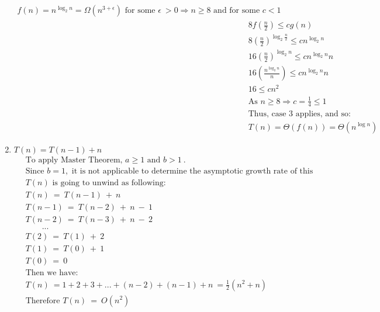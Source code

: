 \documentclass[a4paper]{scrartcl}
\begin{document}
\begin{enumerate}[label=(\alph*)]
\begin{align*}
   f(n)=n^{\log_2{n}}=\Omega(n^{3+\epsilon})\text{ for some }\epsilon\ >0 \Rightarrow n \geq 8\text{ and for some }c < 1\\ &\
   8f(\frac{n}{2}) \leq c g(n)\\ &\
   8(\frac{n}{2})^{\log_2{\frac{n}{2}}} \leq c n^{\log_2{n}} \\ &\
   16(\frac{n}{2})^{\log_2{n}} \leq c n^{\log_2{n}}n\\ &\
   16(\frac{n^{\log_2{n}}}{n}) \leq c n^{\log_2{n}}n\\ &\ 
   16 \leq c n^2 \\ &\ 
   \text{As } n\geq 8 \Rightarrow c = \frac{1}{4} \leq 1\\ &\
   \text{Thus, case 3 applies, and so: }\\ &\ T(n)=\Theta(f(n))=\Theta(n^{\log{n}})
\end{align*}
\item $T (n) = T (n - 1) + n$
\begin{align*}
  &\ \text{To apply Master Theorem, }a \geq 1\text{ and }b > 1\ .\\ &\
  \text{Since }b = 1,\text{ it is not applicable to determine the asymptotic growth rate of this recurrences.}\\ &\
  T(n)\text{ is going to unwind as following:}\\ &\
  T(n)\ =\ T(n-1)\ +\ n\\ &\
  T(n-1)\ =\ T(n-2)\ +\ n\ -\ 1\\ &\
  T(n-2)\ =\ T(n-3)\ +\ n\ -\ 2\\ &\
  \qquad ...\\ &\
  T(2)\ =\ T(1)\ +\ 2\\ &\
  T(1)\ =\ T(0)\ +\ 1\\ &\
  T(0)\ =\ 0\\ &\
  \text{Then we have:}\\ &\
  T(n)\ = 1+2+3+...+(n-2)+(n-1)+n\ =\frac{1}{2}(n^2+n)\\ &\
  \text{Therefore }T(n)\ =\ O(n^2)
\end{align*}
\end{enumerate}
\end{document}
